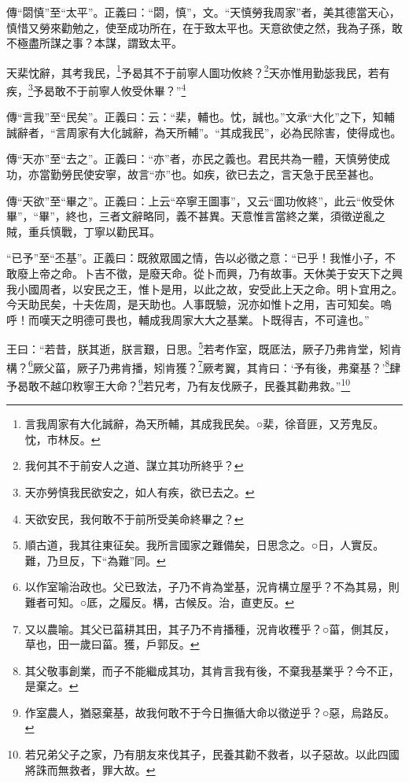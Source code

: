 {\noindent\zhuan{}\fzbyks 傳“閟慎”至“太平”。正義曰：“閟，慎”，文。“天慎勞我周家”者，美其德當天心，慎惜又勞來勸勉之，使至成功所在，在于致太平也。天意欲使之然，我為子孫，敢不極盡所謀之事？本謀，謂致太平。 \par}

天棐忱辭，其考我民，\footnote{言我周家有大化誠辭，為天所輔，其成我民矣。○棐，徐音匪，又芳鬼反。忱，市林反。}予曷其不于前寧人圖功攸終？\footnote{我何其不于前安人之道、謀立其功所終乎？}天亦惟用勤毖我民，若有疾，\footnote{天亦勞慎我民欲安之，如人有疾，欲已去之。}予曷敢不于前寧人攸受休畢？”\footnote{天欲安民，我何敢不于前所受美命終畢之？}

{\noindent\zhuan{}\fzbyks 傳“言我”至“民矣”。正義曰：云：“棐，輔也。忱，誠也。”文承“大化”之下，知輔誠辭者，“言周家有大化誠辭，為天所輔”。“其成我民”，必為民除害，使得成也。 \par}

{\noindent\zhuan{}\fzbyks 傳“天亦”至“去之”。正義曰：“亦”者，亦民之義也。君民共為一體，天慎勞使成功，亦當勤勞民使安寧，故言“亦”也。如疾，欲已去之，言天急于民至甚也。 \par}

{\noindent\zhuan{}\fzbyks 傳“天欲”至“畢之”。正義曰：上云“卒寧王圖事”，又云“圖功攸終”，此云“攸受休畢”，“畢”，終也，三者文辭略同，義不甚異。天意惟言當終之業，須徵逆亂之賊，重兵慎戰，丁寧以勸民耳。 \par}

{\noindent\shu{}\fzkt “已予”至“丕基”。正義曰：既敘眾國之情，告以必徵之意：“已乎！我惟小子，不敢廢上帝之命。卜吉不徵，是廢天命。從卜而興，乃有故事。天休美于安天下之興我小國周者，以安民之王，惟卜是用，以此之故，安受此上天之命。明卜宜用之。今天助民矣，十夫佐周，是天助也。人事既驗，況亦如惟卜之用，吉可知矣。嗚呼！而嘆天之明德可畏也，輔成我周家大大之基業。卜既得吉，不可違也。” \par}

王曰：“若昔，朕其逝，朕言艱，日思。\footnote{順古道，我其往東征矣。我所言國家之難備矣，日思念之。○日，人實反。難，乃旦反，下“為難”同。}若考作室，既厎法，厥子乃弗肯堂，矧肯構？\footnote{以作室喻治政也。父已致法，子乃不肯為堂基，況肯構立屋乎？不為其易，則難者可知。○厎，之履反。構，古候反。治，直吏反。}厥父菑，厥子乃弗肯播，矧肯獲？\footnote{又以農喻。其父已菑耕其田，其子乃不肯播種，況肯收穫乎？○菑，側其反，草也，田一歲曰菑。獲，戶郭反。}厥考翼，其肯曰：‘予有後，弗棄基？’\footnote{其父敬事創業，而子不能繼成其功，其肯言我有後，不棄我基業乎？今不正，是棄之。}肆予曷敢不越卬敉寧王大命？\footnote{作室農人，猶惡棄基，故我何敢不于今日撫循大命以徵逆乎？○惡，烏路反。}若兄考，乃有友伐厥子，民養其勸弗救。”\footnote{若兄弟父子之家，乃有朋友來伐其子，民養其勸不救者，以子惡故。以此四國將誅而無救者，罪大故。}


